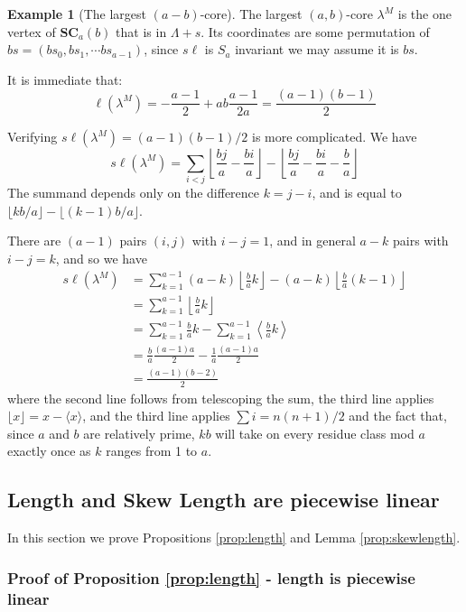\documentclass{amsart}[12pt]
\theoremstyle{definition}
\newtheorem{example}[dummy]{Example}
\newcommand{\SC}{\mathbf{SC}}
\newcommand{\sk}{s\ell}
\begin{document}
\begin{example}[The largest $(a-b)$-core]

The largest $(a,b)$-core $\lambda^M$ is the one vertex of $\SC_a(b)$ that is in $\Lambda+s$.  Its coordinates are some permutation of
$bs=(bs_0,bs_1,\cdots bs_{a-1})$, since $\sk$ is $S_a$ invariant we may assume it is $bs$.  

It is immediate that:
$$\ell(\lambda^M)=-\frac{a-1}{2}+ab\frac{a-1}{2a}=\frac{(a-1)(b-1)}{2}$$

Verifying $\sk(\lambda^M)=(a-1)(b-1)/2$ is more complicated.  We have 
$$\sk(\lambda^M)=\sum_{i<j} \left\lfloor \frac{bj}{a}-\frac{bi}{a}\right\rfloor
-\left\lfloor \frac{bj}{a}-\frac{bi}{a}-\frac{b}{a}\right\rfloor$$
The summand depends only on the difference $k=j-i$, and is equal to $\lfloor kb/a\rfloor-\lfloor(k-1)b/a\rfloor$.

There are $(a-1)$ pairs $(i,j)$ with $i-j=1$, and in general $a-k$ pairs with $i-j=k$, and so we have
\begin{align*}
\sk(\lambda^M) &=\sum_{k=1}^{a-1}(a-k)\left\lfloor \frac{b}{a} k\right\rfloor-(a-k)\left\lfloor\frac{b}{a}(k-1)\right\rfloor \\
&=\sum_{k=1}^{a-1} \left\lfloor \frac{b}{a} k\right\rfloor \\
&=\sum_{k=1}^{a-1} \frac{b}{a}k-\sum_{k=1}^{a-1}\left\langle \frac{b}{a}k\right\rangle \\
&=\frac{b}{a} \frac{(a-1)a}{2}-\frac{1}{a}\frac{(a-1)a}{2} \\
&=\frac{(a-1)(b-2)}{2}
\end{align*}
where the second line follows from telescoping the sum, the third line applies $\lfloor x\rfloor=x-\langle x\rangle$, and the third line applies $\sum i=n(n+1)/2$ and the fact that, since $a$ and $b$ are relatively prime, $kb$ will take on every residue class mod $a$ exactly once as $k$ ranges from 1 to $a$.

\end{example}


\subsection{Length and Skew Length are piecewise linear}
In this section we prove Propositions \ref{prop:length} and Lemma \ref{prop:skewlength}.

\subsubsection{Proof of Proposition \ref{prop:length} - length is piecewise linear} 
\end{document}
